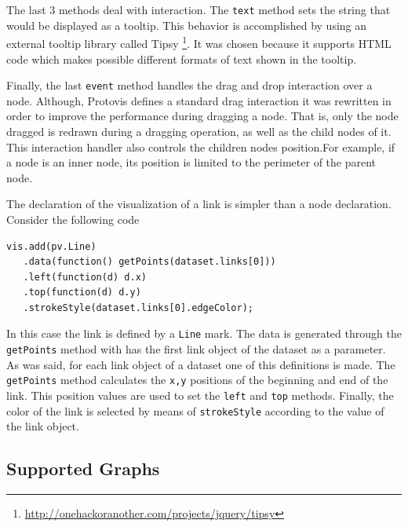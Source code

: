 \documentclass[preprint,10pt]{sigplanconf}
\newcommand{\ct}{\lstinline[backgroundcolor=\color{white},basicstyle=\footnotesize\ttfamily]}
\begin{document}
The last 3 methods deal with interaction. The \ct{text} method sets the string that would be displayed as a tooltip. This behavior is accomplished by using an external tooltip library called Tipsy \footnote{\url{http://onehackoranother.com/projects/jquery/tipsy}}. It was chosen because it supports HTML code which makes possible different formats of text shown in the tooltip. 

Finally, the last \ct{event} method handles the drag and drop interaction over a node. Although, Protovis defines a standard drag interaction it was rewritten in order to improve the performance during dragging a node. That is,  only the node dragged is redrawn during a dragging operation, as well as the child nodes of it. This interaction handler also controls the children nodes position.For example, if a node is an inner node, its position is limited to the perimeter of the parent node.

The declaration of the visualization of a link is simpler than a node declaration. Consider the following code 
\begin{lstlisting} 
vis.add(pv.Line)
   .data(function() getPoints(dataset.links[0]))
   .left(function(d) d.x)
   .top(function(d) d.y)
   .strokeStyle(dataset.links[0].edgeColor);
\end{lstlisting}
In this case the link is defined by a \ct{Line} mark. The data is generated through the \ct{getPoints} method with has the first link object of the dataset as a parameter. As was said, for each link object of a dataset one of this definitions is made. The \ct{getPoints} method calculates the \ct{x,y} positions of the beginning and end of the link. This position values are used to set the \ct{left} and \ct{top} methods. Finally, the color of the link is selected by means of \ct{strokeStyle} according to the value of the link object.

\subsection{Supported Graphs}

\end{document}
